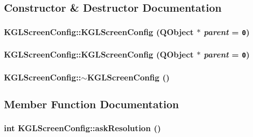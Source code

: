 \subsection{Constructor \& Destructor Documentation}
\hypertarget{class_k_g_l_screen_config_07864ac585640b6dc1857ad357d1b252}{
\subsubsection[{KGLScreenConfig}]{\setlength{\rightskip}{0pt plus 5cm}KGLScreenConfig::KGLScreenConfig (QObject $\ast$ {\em parent} = {\tt 0})}}
\label{class_k_g_l_screen_config_07864ac585640b6dc1857ad357d1b252}


\hypertarget{class_k_g_l_screen_config_07864ac585640b6dc1857ad357d1b252}{
\subsubsection[{KGLScreenConfig}]{\setlength{\rightskip}{0pt plus 5cm}KGLScreenConfig::KGLScreenConfig (QObject $\ast$ {\em parent} = {\tt 0})}}
\label{class_k_g_l_screen_config_07864ac585640b6dc1857ad357d1b252}


\hypertarget{class_k_g_l_screen_config_028b8c6174731641ed8443c6e02ab232}{
\subsubsection[{$\sim$KGLScreenConfig}]{\setlength{\rightskip}{0pt plus 5cm}KGLScreenConfig::$\sim$KGLScreenConfig ()}}
\label{class_k_g_l_screen_config_028b8c6174731641ed8443c6e02ab232}




\subsection{Member Function Documentation}
\hypertarget{class_k_g_l_screen_config_289cc45b508464a2ec12d47dbbc3f1f3}{
\subsubsection[{askResolution}]{\setlength{\rightskip}{0pt plus 5cm}int KGLScreenConfig::askResolution ()}}
\label{class_k_g_l_screen_config_289cc45b508464a2ec12d47dbbc3f1f3}


